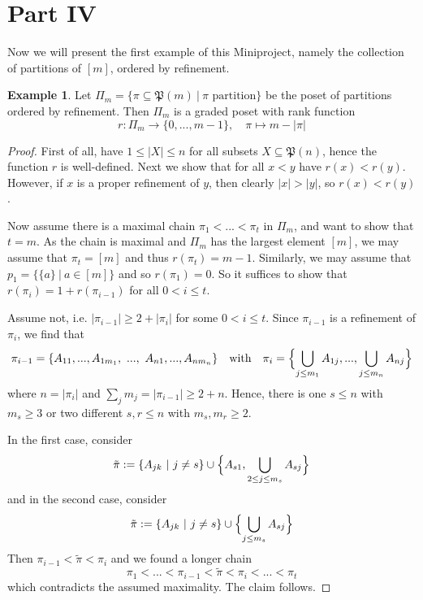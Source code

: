 \documentclass{scrartcl}
\newcommand{\powerset}{\mathfrak{P}}
\theoremstyle{definition}
\newtheorem{example}[definition]{Example}
\begin{document}
\section{Part IV}
Now we will present the first example of this Miniproject, namely the collection of partitions of $[m]$, ordered by refinement.
\begin{example}
    Let $\Pi_m = \{ \pi \subseteq \powerset(m) \ | \ \text{$\pi$ partition} \}$ be the poset of partitions ordered by refinement.
    Then $\Pi_m$ is a graded poset with rank function
    \begin{equation*}
        r: \Pi_m \to \{ 0, ..., m - 1 \}, \quad \pi \mapsto m - |\pi|
    \end{equation*}
\end{example}
\begin{proof}
    First of all, have $1 \leq |X| \leq n$ for all subsets $X \subseteq \powerset(n)$, hence the function $r$ is well-defined.
    Next we show that for all $x < y$ have $r(x) < r(y)$.
    However, if $x$ is a proper refinement of $y$, then clearly $|x| > |y|$, so $r(x) < r(y)$.

    Now assume there is a maximal chain $\pi_1 < ... < \pi_t$ in $\Pi_m$, and want to show that $t = m$.
    As the chain is maximal and $\Pi_m$ has the largest element $[m]$, we may assume that $\pi_t = [m]$ and thus $r(\pi_t) = m - 1$.
    Similarly, we may assume that $p_1 = \{ \{a\} \ | \ a \in [m]\}$ and so $r(\pi_1) = 0$.
    So it suffices to show that $r(\pi_i) = 1 + r(\pi_{i - 1})$ for all $0 < i \leq t$.

    Assume not, i.e. $|\pi_{i - 1}| \geq 2 + |\pi_i|$ for some $0 < i \leq t$.
    Since $\pi_{i - 1}$ is a refinement of $\pi_i$, we find that
    \begin{equation*}
        \pi_{i - 1} = \{ A_{11}, ..., A_{1m_1}, \ ..., \ A_{n1}, ..., A_{nm_n} \} \quad \text{with} \quad \pi_i = \Bigl\{ \bigcup_{j \leq m_1} A_{1j}, ..., \bigcup_{j \leq m_n} A_{nj} \Bigr\}
    \end{equation*}
    where $n = |\pi_i|$ and $\sum_j m_j = |\pi_{i - 1}| \geq 2 + n$.
    Hence, there is one $s \leq n$ with $m_s \geq 3$ or two different $s, r \leq n$ with $m_s, m_r \geq 2$.
    
    In the first case, consider
    \begin{equation*}
        \tilde{\pi} := \{ A_{jk} \ | \ j \neq s \} \cup \Bigl\{ A_{s1}, \bigcup_{2 \leq j \leq m_s} A_{sj} \Bigr\}
    \end{equation*}
    and in the second case, consider
    \begin{equation*}
        \tilde{\pi} := \{ A_{jk} \ | \ j \neq s \} \cup \Bigl\{ \bigcup_{j \leq m_s} A_{sj} \Bigr\}
    \end{equation*}
    Then $\pi_{i - 1} < \tilde{\pi} < \pi_i$ and we found a longer chain
    \begin{equation*}
        \pi_1 < ... < \pi_{i - 1} < \tilde{\pi} < \pi_i < ... < \pi_t
    \end{equation*}
    which contradicts the assumed maximality. The claim follows.
\end{proof}
\end{document}
